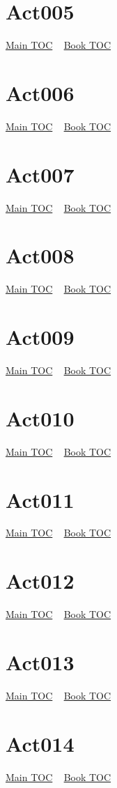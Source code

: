 \documentclass{book}
\begin{document}
  \section{Act005}\hyperlink{toc}{Main TOC} ~ \hyperref[subsec:Act]{Book TOC} 
  \section{Act006}\hyperlink{toc}{Main TOC} ~ \hyperref[subsec:Act]{Book TOC} 
  \section{Act007}\hyperlink{toc}{Main TOC} ~ \hyperref[subsec:Act]{Book TOC} 
  \section{Act008}\hyperlink{toc}{Main TOC} ~ \hyperref[subsec:Act]{Book TOC} 
  \section{Act009}\hyperlink{toc}{Main TOC} ~ \hyperref[subsec:Act]{Book TOC} 
  \section{Act010}\hyperlink{toc}{Main TOC} ~ \hyperref[subsec:Act]{Book TOC} 
  \section{Act011}\hyperlink{toc}{Main TOC} ~ \hyperref[subsec:Act]{Book TOC} 
  \section{Act012}\hyperlink{toc}{Main TOC} ~ \hyperref[subsec:Act]{Book TOC} 
  \section{Act013}\hyperlink{toc}{Main TOC} ~ \hyperref[subsec:Act]{Book TOC} 
  \section{Act014}\hyperlink{toc}{Main TOC} ~ \hyperref[subsec:Act]{Book TOC} 
\end{document}
